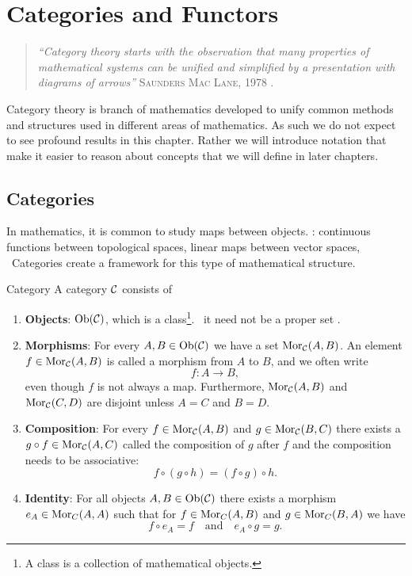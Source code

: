 \chapter{Categories and Functors}
\label{chapter__category_theory}

\begin{quote}
\textit{``Category theory starts with the observation that many properties of mathematical systems can be unified and simplified by a presentation with diagrams of arrows''} \hfill \textsc{Saunders Mac Lane}, 1978 \cite[p.~1]{MacLane1978}. \hspace*{5mm}
\end{quote}

Category theory is branch of mathematics developed to unify common methods and structures used in different areas of mathematics. As such we do not expect to see profound results in this chapter. Rather we will introduce notation that make it easier to reason about concepts that we will define in later chapters.

\section{Categories}

In mathematics, it is common to study maps between objects.
\Eg: continuous functions between topological spaces, linear maps between vector spaces, \etc\
Categories create a framework for this type of mathematical structure.

\begin{definition}{Category \cite[Sec.~1.2]{Roman2017}}{}
A category $\mathcal{C}$ consists of
\begin{enumerate}
    \item \textbf{Objects}: $\mathrm {Ob}(\mathcal{C})$, which is a class\footnote{A class is a collection of mathematical objects.}. \Ie\ it need not be a proper set \cite[p.~1]{Roman2017}.
    
    \item \textbf{Morphisms}: For every $A, B \in \mathrm {Ob}(\mathcal{C})$ we have a set $\mathrm {Mor}_{\mathcal{C}}(A,B)$. An element $f \in \mathrm {Mor}_{\mathcal{C}}(A,B)$ is called a morphism from $A$ to $B$, and we often write 
    $$
    f: A \to B,
    $$
    even though $f$ is not always a map. Furthermore, $\mathrm {Mor}_{\mathcal{C}}(A,B)$ and $\mathrm {Mor}_{\mathcal{C}}(C,D)$ are disjoint unless $A = C$ and $B = D$.
    
    \item \textbf{Composition}: For every $f \in \mathrm {Mor}_{\mathcal{C}}(A,B)$ and $g \in \mathrm {Mor}_{\mathcal{C}}(B,C)$ there exists a $g \circ f \in \mathrm {Mor}_{\mathcal{C}}(A,C)$ called the composition of $g$ after $f$ and the composition needs to be associative: 
    $$
    f \circ (g \circ h) = (f \circ g) \circ h.
    $$

    \item \textbf{Identity}: For all objects $A,B \in \mathrm {Ob}(\mathcal{C})$ there exists a morphism ${e_A \in \mathrm {Mor}_C(A,A)}$ such that for $f \in \mathrm {Mor}_C(A,B)$ and $g \in \mathrm {Mor}_C(B,A)$ we have
    $$
    f \circ e_A = f \quad \text{and} \quad e_A \circ g = g.
    $$
\end{enumerate}
\end{definition}

